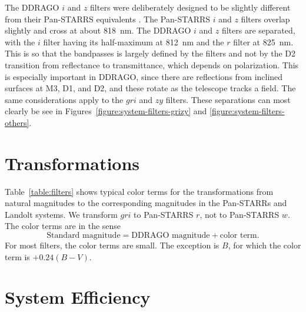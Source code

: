 The DDRAGO $i$ and $z$ filters were deliberately designed to be slightly different from their Pan-STARRS equivalents \citep{Tonry-2012}. The Pan-STARRS $i$ and $z$ filters overlap slightly and cross at about 818~nm. The DDRAGO $i$ and $z$ filters are separated, with the $i$ filter having its half-maximum at 812~nm and the $r$ filter at 825~nm. This is so that the bandpasses is largely defined by the filters and not by the D2 transition from reflectance to transmittance, which depends on polarization. This is especially important in DDRAGO, since there are reflections from inclined surfaces at M3, D1, and D2, and these rotate as the telescope tracks a field. The same considerations apply to the $gri$ and $zy$ filters. These separations can most clearly be see in Figures~\ref{figure:system-filters-grizy} and \ref{figure:system-filters-others}.


\section{Transformations}

Table~\ref{table:filters} shows typical color terms for the transformations from natural magnitudes to the corresponding magnitudes in the Pan-STARRs and Landolt systems. We transform $gri$ to Pan-STARRS $r$, not to Pan-STARRS $w$. The color terms are in the sense
$$
\mbox{Standard magnitude} = \mbox{DDRAGO magnitude} + \mbox{color term}.
$$
For most filters, the color terms are small. The exception is $B$, for which the color term is $+0.24(B-V)$.

\section{System Efficiency}

